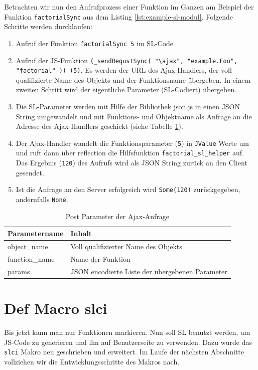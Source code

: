 \documentclass[12pt,bibtotoc]{scrreprt}
\begin{document}
Betrachten wir nun den Aufrufprozess einer Funktion im Ganzen am Beispiel der Funktion \lstinline!factorialSync! aus dem Listing \ref{lst:example-sl-modul}. Folgende Schritte werden durchlaufen:
\begin{enumerate}
 \item{Aufruf der Funktion \lstinline!factorialSync 5! im \ac{SL}-Code}
 \item{Aufruf der \ac{JS}-Funktion \lstinline!(_sendRequstSync( "\ajax", "example.Foo", "factorial" )) (5)!. Es werden der \ac{URL} des Ajax-Handlers, der voll qualifizierte Name des Objekts und der Funktionsname übergeben. In einem zweiten Schritt wird der eigentliche Parameter (\ac{SL}-Codiert) übergeben.}
 \item{Die \ac{SL}-Parameter werden mit Hilfe der Bibliothek json.js \cite{Crockford2010} in einen JSON String umgewandelt und mit Funktions- und Objektname als Anfrage an die Adresse des Ajax-Handlers geschickt (siehe Tabelle \ref{tab:post-parameter}).}
 \item{Der Ajax-Handler wandelt die Funktionsparameter (\lstinline!5!) in \lstinline!JValue! Werte um \cite{Json4s} und ruft dann über reflection die Hilfsfunktion \lstinline!factorial_sl_helper! auf. Das Ergebnis (\lstinline!120!) des Aufrufs wird als JSON String zurück an den Client gesendet.}
 \item{Ist die Anfrage an den Server erfolgreich wird \lstinline!Some(120)! zurückgegeben, andernfalls \lstinline!None!.}
\end{enumerate}

\begin{table}[h]
\caption{Post Parameter der Ajax-Anfrage}
\centering
\begin{tabular}{ll}
Parametername        &   Inhalt \\
\hline
object\_name   & Voll qualifizierter Name des Objekts \\
function\_name & Name der Funktion\\
params         & JSON encodierte Liste der übergebenen Parameter\\
\end{tabular}
\label{tab:post-parameter}
\end{table}

\section{Def Macro slci}
\label{sec:inline-macro}

Bis jetzt kann man nur Funktionen markieren. Nun soll \ac{SL} benutzt werden, um \ac{JS}-Code zu generieren und ihn auf Benutzerseite zu verwenden. Dazu wurde das \lstinline!slci! Makro neu geschrieben und erweitert. Im Laufe der nächsten Abschnitte vollziehen wir die Entwicklungsschritte des Makros nach.
\end{document}
